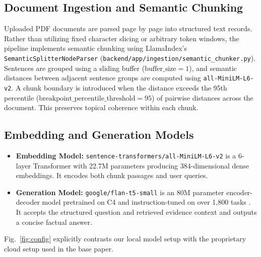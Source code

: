 \documentclass[conference]{IEEEtran}
\begin{document}
\subsection{Document Ingestion and Semantic Chunking}
Uploaded PDF documents are parsed page by page into structured text records. Rather than utilizing fixed character slicing or arbitrary token windows, the pipeline implements semantic chunking using LlamaIndex's \texttt{SemanticSplitterNodeParser} (\texttt{backend/app/ingestion/semantic\_chunker.py}). Sentences are grouped using a sliding buffer ($\text{buffer\_size} = 1$), and semantic distances between adjacent sentence groups are computed using \texttt{all-MiniLM-L6-v2}. A chunk boundary is introduced when the distance exceeds the 95th percentile ($\text{breakpoint\_percentile\_threshold} = 95$) of pairwise distances across the document. This preserves topical coherence within each chunk.

\subsection{Embedding and Generation Models}
\begin{itemize}
\item \textbf{Embedding Model:} \texttt{sentence-transformers/all-MiniLM-L6-v2} \cite{hf_minilm} is a 6-layer Transformer with 22.7M parameters producing 384-dimensional dense embeddings. It encodes both chunk passages and user queries.
\item \textbf{Generation Model:} \texttt{google/flan-t5-small} \cite{hf_flan} is an 80M parameter encoder-decoder model pretrained on C4 and instruction-tuned on over 1,800 tasks \cite{chung2022flan}. It accepts the structured question and retrieved evidence context and outputs a concise factual answer.
\end{itemize}
Fig.~\ref{fig:config} explicitly contrasts our local model setup with the proprietary cloud setup used in the base paper.
\end{document}
